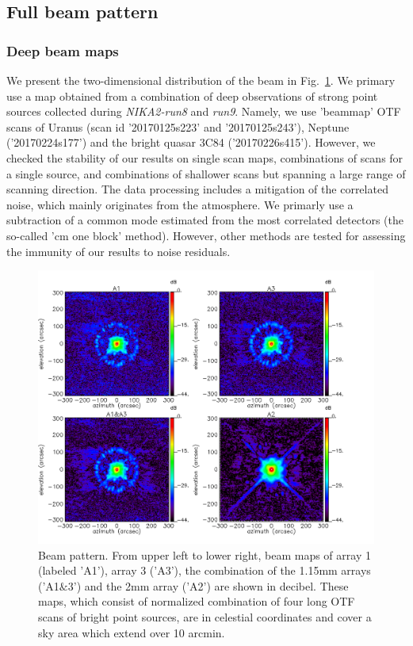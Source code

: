 \subsection{Full beam pattern}

\subsubsection{Deep beam maps}
We present the two-dimensional distribution of the beam in Fig.~\ref{fig:beam}. We primary use a map obtained from a combination of deep observations of strong point sources collected during \emph{NIKA2-run8} and \emph{run9}. Namely, we use 'beammap' OTF scans of Uranus (scan id '20170125s223' and '20170125s243'),  Neptune ('20170224s177') and the bright quasar 3C84 ('20170226s415'). However, we checked the stability of our results on single scan maps, combinations of scans for a single source, and combinations of shallower scans but spanning a large range of scanning direction. The data processing includes a mitigation of the correlated noise, which mainly originates from the atmosphere.  We primarly use a subtraction of a common mode estimated from the most correlated detectors (the so-called 'cm one block' method). However, other methods are tested for assessing the immunity of our results to noise residuals.

\begin{figure}
\begin{center}
  \includegraphics[clip, angle=0, scale=0.4]{Figures/Lobe_map_Combo_v2_dB.pdf}
 \caption{Beam pattern. From upper left to lower right, beam maps of array 1 (labeled 'A1'), array 3 ('A3'), the combination of the 1.15mm arrays ('A1$\&$3') and the 2mm array ('A2') are shown in decibel. These maps, which consist of normalized combination of four long OTF scans of bright point sources, are in celestial coordinates and cover a sky area which extend over 10 arcmin.}
\label{fig:beam}
\end{center}
\end{figure}


